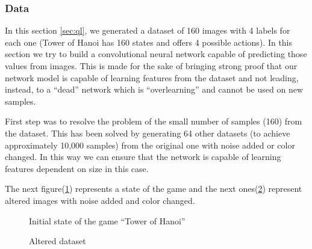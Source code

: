\subsubsection{Data}

In this section \ref{sec:ql}, we generated a dataset of 160 images with 4 labels for each one (Tower of Hanoi has 160 states and offers 4 possible actions). In this section we try to build a convolutional neural network capable of predicting those values from images. This is made for the sake of bringing strong proof that our network model is capable of learning features from the dataset and not leading, instead, to a ``dead'' network which is ``overlearning'' and cannot be used on new samples.

First step was to resolve the problem of the small number of samples (160) from the dataset. This has been solved by generating 64 other datasets (to achieve approximately 10,000 samples) from the original one with noise added or color changed. In this way we can ensure that the network is capable of learning features dependent on size in this case.

The next figure(\ref{fig:155}) represents a state of the game and the next ones(\ref{fig:states}) represent altered images with noise added and color changed.

\begin{figure}[h]
	\begin{center}
		\caption{Initial state of the game ``Tower of Hanoi''} \label{fig:155}
    \end{center}
\end{figure}

\begin{figure}[h]
	\begin{center}
		\caption{Altered dataset} \label{fig:states}
    \end{center}
\end{figure}


